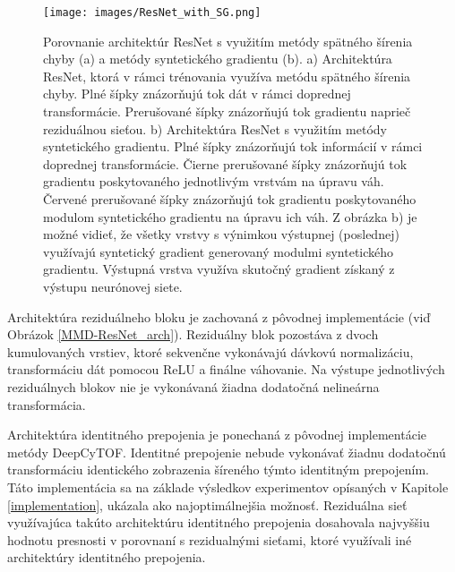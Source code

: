 \begin{figure}

\centerline{\texttt{[image: images/ResNet\_with\_SG.png]}}
\caption[Reziduálna sieť s implementovaným algoritmom syntetického gradientu]{Porovnanie architektúr ResNet s využitím metódy spätného šírenia chyby (a) a metódy syntetického gradientu (b). a) Architektúra ResNet, ktorá v rámci trénovania využíva metódu spätného šírenia chyby. Plné šípky znázorňujú tok dát v rámci doprednej transformácie. Prerušované šípky znázorňujú tok gradientu naprieč reziduálnou sieťou. b) Architektúra ResNet s využitím metódy syntetického gradientu. Plné šípky znázorňujú tok informácií v rámci doprednej transformácie. Čierne prerušované šípky znázorňujú tok gradientu poskytovaného jednotlivým vrstvám na úpravu váh. Červené prerušované šípky znázorňujú tok gradientu poskytovaného modulom syntetického gradientu na úpravu ich váh. Z obrázka b) je možné vidieť, že všetky vrstvy s výnimkou výstupnej (poslednej) využívajú syntetický gradient generovaný modulmi syntetického gradientu. Výstupná vrstva využíva skutočný gradient získaný z výstupu neurónovej siete.}
\label{fig:ResNetWithSG}
\end{figure}


Architektúra reziduálneho bloku je zachovaná z pôvodnej implementácie (viď Obrázok \ref{MMD-ResNet_arch}). Reziduálny blok pozostáva z dvoch kumulovaných vrstiev, ktoré sekvenčne vykonávajú dávkovú normalizáciu, transformáciu dát pomocou ReLU a finálne váhovanie. Na výstupe jednotlivých reziduálnych blokov nie je vykonávaná žiadna dodatočná nelineárna transformácia.

Architektúra identitného prepojenia je ponechaná z pôvodnej implementácie metódy DeepCyTOF. Identitné prepojenie nebude vykonávať žiadnu dodatočnú transformáciu identického zobrazenia šíreného týmto identitným prepojením. Táto implementácia sa na základe výsledkov experimentov opísaných v Kapitole \ref{implementation}, ukázala ako najoptimálnejšia možnosť. Reziduálna sieť využívajúca takúto architektúru identitného prepojenia dosahovala najvyššiu hodnotu presnosti v porovnaní s rezidualnými sieťami, ktoré využívali iné architektúry identitného prepojenia.


